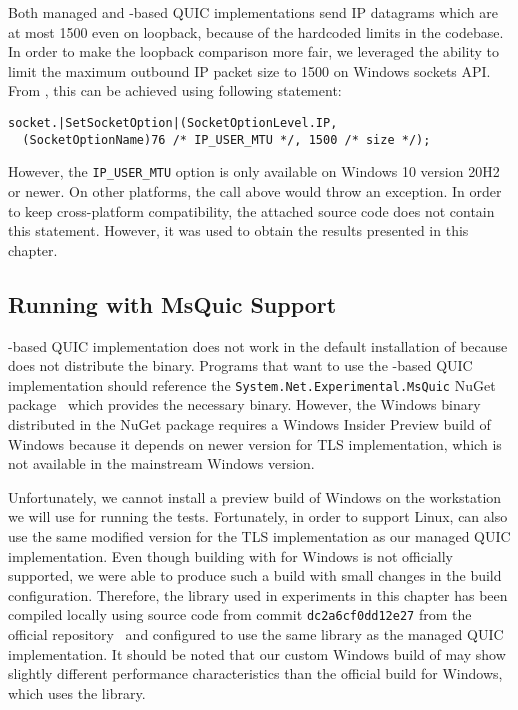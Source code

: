 Both managed and \libmsquic{}-based QUIC implementations send IP datagrams which are at most
\SI{1500}{\byte} even on loopback, because of the hardcoded limits in the codebase. In order to make
the loopback comparison more fair, we leveraged the ability to limit the maximum outbound IP packet
size to \SI{1500}{\byte} on Windows sockets API\@. From \csharp{}, this can be achieved using
following statement:

\begin{lstlisting}[numbers=none,enums={SocketOptionLevel,SocketOptionName}]
socket.|SetSocketOption|(SocketOptionLevel.IP,
  (SocketOptionName)76 /* IP_USER_MTU */, 1500 /* size */);
\end{lstlisting}

However, the \texttt{IP_USER_MTU} option is only available on Windows 10 version 20H2 or newer. On
other platforms, the  call above would throw an exception. In order to keep
cross-platform compatibility, the attached source code does not contain this statement. However, it
was used to obtain the results presented in this chapter.

\subsection{Running with MsQuic Support}

\libmsquic{}-based QUIC implementation does not work in the default installation of \dotnet{}
because \dotnet{} does not distribute the \libmsquic{} binary. Programs that want to use the
\libmsquic{}-based QUIC implementation should reference the
\texttt{System.Net\allowbreak{}.Experimental.MsQuic} NuGet
package~\cite{SystemNetQuicExperimentalMsquic} which provides the necessary \libmsquic{} binary.
However, the Windows \libmsquic{} binary distributed in the NuGet package requires a Windows Insider
Preview build of Windows because it depends on newer \libschannel{} version for TLS implementation,
which is not available in the mainstream Windows version.

Unfortunately, we cannot install a preview build of Windows on the workstation we will use for
running the tests. Fortunately, in order to support Linux, \libmsquic{} can also use the same
modified \libopenssl{} version for the TLS implementation as our managed QUIC implementation. Even
though building \libmsquic{} with \libopenssl{} for Windows is not officially supported, we were
able to produce such a build with small changes in the \libmsquic{} build configuration. Therefore,
the \libmsquic{} library used in experiments in this chapter has been compiled locally using source
code from commit \texttt{dc2a6cf0dd12e27} from the official \libmsquic{}
repository~\cite{msquicGithub} and configured to use the same \libopenssl{} library as the managed
QUIC implementation. It should be noted that our custom Windows build of \libmsquic{} may show
slightly different performance characteristics than the official build for Windows, which uses the
\libschannel{} library.


